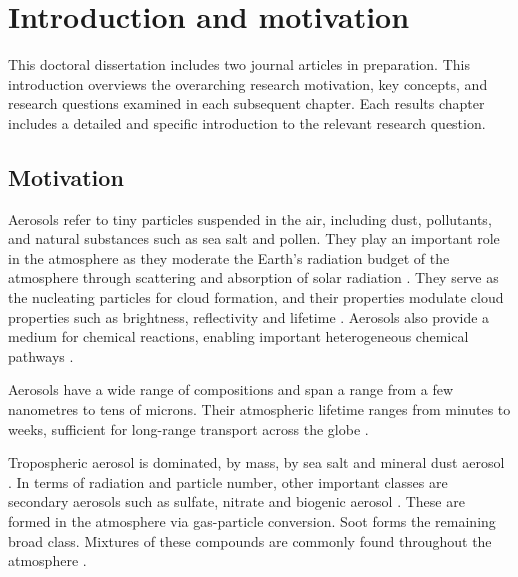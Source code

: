 
\chapter{Introduction and motivation}  %
\label{ch1}

\ifpdf
    \graphicspath{{Chapter1/Figs/Raster/}{Chapter1/Figs/PDF/}{Chapter1/Figs/}}
\else
    \graphicspath{{Chapter1/Figs/Vector/}{Chapter1/Figs/}}
\fi



This doctoral dissertation includes two journal articles in preparation. This introduction overviews the overarching research motivation, key concepts, and research questions examined in each subsequent chapter. Each results chapter includes a detailed and specific introduction to the relevant research question.

\section{Motivation}


Aerosols refer to tiny particles suspended in the air, including dust, pollutants, and natural substances such as sea salt and pollen. They play an important role in the atmosphere as they moderate the Earth's radiation budget of the atmosphere through scattering and absorption of solar radiation \citep{szopaShortlivedClimateForcers2021}.  They serve as the nucleating particles for cloud formation, and their properties modulate cloud properties such as brightness, reflectivity and lifetime \citep{boucherCloudsAerosols2014}.  Aerosols also provide a medium for chemical reactions, enabling important heterogeneous chemical pathways \citep{seinfeldAtmosphericChemistryPhysics2016}.

Aerosols have a wide range of compositions and span a range from a few nanometres to tens of microns.  Their atmospheric lifetime ranges from minutes to weeks, sufficient for long-range transport across the globe \citep{liScatteringAbsorbingAerosols2022}.  

Tropospheric aerosol is dominated, by mass, by sea salt and mineral dust aerosol \citep{szopaShortlivedClimateForcers2021}.  In terms of radiation and particle number, other important classes are secondary aerosols such as sulfate, nitrate and biogenic aerosol \citep{liScatteringAbsorbingAerosols2022}. These are formed in the atmosphere via gas-particle conversion.  Soot forms the remaining broad class.  Mixtures of these compounds are commonly found throughout the atmosphere \citep[e.g.][]{jimenezEvolutionOrganicAerosols2009, bauerTurningPointAerosol2022}.

